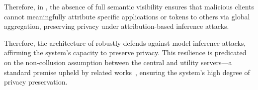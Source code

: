 Therefore, in \Sys, the absence of full semantic visibility ensures that malicious clients cannot meaningfully attribute specific applications or tokens to others via global aggregation, preserving privacy under attribution-based inference attacks.

Therefore, the architecture of \Sys robustly defends against model inference attacks, affirming the system's capacity to preserve privacy. This resilience is predicated on the non-collusion assumption between the central and utility servers—a standard premise upheld by related works~\cite{roy2020crypte,wu2022federated}, ensuring the system's high degree of privacy preservation.